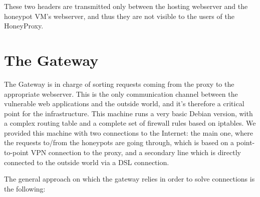 These two headers are transmitted only between the hosting webserver and the honeypot VM's webserver, and thus they are not visible to the users of the HoneyProxy.

\section {The Gateway}

The Gateway is in charge of sorting requests coming from the proxy to the appropriate webserver. This is the only communication channel between the vulnerable web applications and the outside world, and it's therefore a critical point for the infrastructure.
This machine runs a very basic Debian version, with a complex routing table and a complete set of firewall rules based on iptables. We provided this machine with two connections to the Internet: the main one, where the requests to/from the honeypots are going through, which is based on a point-to-point VPN connection to the proxy, and a secondary line which is directly connected to the outside world via a DSL connection.

The general approach on which the gateway relies in order to solve connections is the following:

